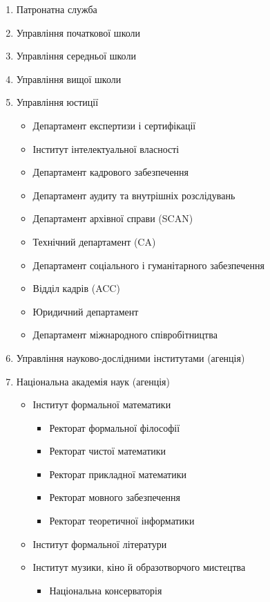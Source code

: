 \begin{enumerate}
    \item Патронатна служба
    \item Управління початкової школи
    \item Управління середньої школи
    \item Управління вищої школи
    \item Управління юстиції
    \begin{itemize}
        \item Департамент експертизи і сертифікації
        \item Інститут інтелектуальної власності
        \item Департамент кадрового забезпечення
        \item Департамент аудиту та внутрішніх розслідувань
        \item Департамент архівної справи (SCAN)
        \item Технічний департамент (CA)
        \item Департамент соціального і гуманітарного забезпечення
        \item Відділ кадрів (ACC)
        \item Юридичний департамент
        \item Департамент міжнародного співробітництва
    \end{itemize}
    \item Управління науково-дослідними інститутами (агенція)
    \item Національна академія наук (агенція)
    \begin{itemize}
        \item Інститут формальної математики
        \begin{itemize}
            \item Ректорат формальної філософії
            \item Ректорат чистої математики
            \item Ректорат прикладної математики
            \item Ректорат мовного забезпечення
            \item Ректорат теоретичної інформатики
        \end{itemize}
        \item Інститут формальної літератури
        \item Інститут музики, кіно й образотворчого мистецтва
        \begin{itemize}
            \item Національна консерваторія

\end{itemize}
\end{itemize}
\end{enumerate}
